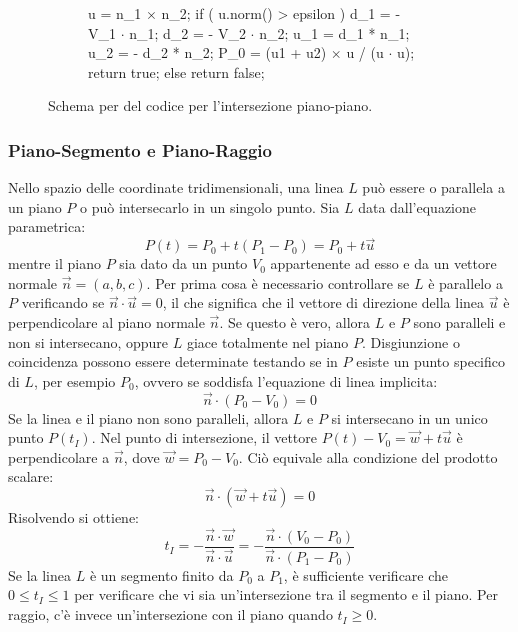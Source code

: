 \begin{figure}[htbp]
	\centering
	\begin{subfigure}{.65\linewidth}
		\begin{pseudoc}
	u = n_1 $\times$ n_2;
	if ( u.norm() > epsilon ) {
		d_1 = - V_1 $\cdot$ n_1;
		d_2 = - V_2 $\cdot$ n_2;
		u_1 = d_1 * n_1;
		u_2 = - d_2 * n_2;
		P_0 = (u1 + u2) $\times$ u / (u $\cdot$ u);
		return true;
	} else {
		return false;
	}
		\end{pseudoc}
	\end{subfigure}
	\caption{Schema per del codice per l'intersezione piano-piano.}
\end{figure}
%
\subsubsection{Piano-Segmento e Piano-Raggio}
Nello spazio delle coordinate tridimensionali, una linea $L$ può essere o parallela a un piano $P$ o può intersecarlo in un singolo punto. Sia $L$ data dall'equazione parametrica:
\begin{equation}
P(t) = P_0 + t(P_1-P_0) = P_0 + t\vec{u}
\end{equation}
mentre il piano $P$ sia dato da un punto $V_0$ appartenente ad esso e da un vettore normale $\vec{n} = (a,b,c)$. Per prima cosa è necessario controllare se $L$ è parallelo a $P$ verificando se $\vec{n}\cdot\vec{u} = 0$, il che significa che il vettore di direzione della linea $\vec{u}$ è perpendicolare al piano normale $\vec{n}$. Se questo è vero, allora $L$ e $P$ sono paralleli e non si intersecano, oppure $L$ giace totalmente nel piano $P$. Disgiunzione o coincidenza possono essere determinate testando se in $P$ esiste un punto specifico di $L$, per esempio $P_0$, ovvero se soddisfa l'equazione di linea implicita:
\begin{equation}
\vec{n} \cdot (P_0-V_0) = 0
\end{equation}
Se la linea e il piano non sono paralleli, allora $L$ e $P$ si intersecano in un unico punto $P(t_I)$. Nel punto di intersezione, il vettore $P(t)-V_0 = \vec{w} + t\vec{u}$ è perpendicolare a $\vec{n}$, dove $\vec{w} = P_0-V_0$. Ciò equivale alla condizione del prodotto scalare:
\begin{equation}
\vec{n} \cdot (\vec{w}+t\vec{u}) = 0
\end{equation}
Risolvendo si ottiene:
\begin{equation}
t_I = -\frac{\vec{n}\cdot\vec{w}}{\vec{n}\cdot\vec{u}}
=
-\frac{\vec{n}\cdot(V_0-P_0)}{\vec{n}\cdot(P_1-P_0)}
\end{equation}
Se la linea $L$ è un segmento finito da $P_0$ a $P_1$, è sufficiente verificare che $0 \leq t_I \leq 1$ per verificare che vi sia un'intersezione tra il segmento e il piano. Per raggio, c'è invece un'intersezione con il piano quando $t_I \geq 0$.

